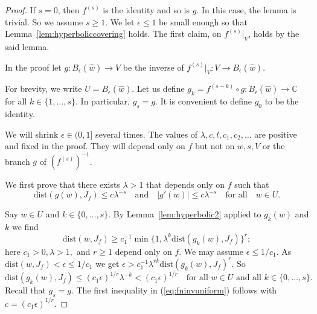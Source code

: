 \documentclass[10pt,a4paper]{amsart}
\newcommand{\varz}{w}
\newcommand{\IC}{\mathbb{C}}
\begin{document}
\begin{proof}
  If $s=0$, then $f^{(s)}$ is the identity and so is $g$. In this
  case, the lemma is trivial. So we assume $s\ge 1$. 
  We let $\epsilon \le 1$ be small enough so that 
  Lemma~\ref{lem:hyperboliccovering} holds.
  The first claim, on $f^{(s)}|_V$, holds by the said lemma.
  
  In the proof let
  $g\colon B_{\epsilon}(\widehat w)\rightarrow V$ be the inverse of
  $f^{(s)}|_V\colon V\rightarrow B_{\epsilon}(\widehat w)$.

  For brevity, we write $U = B_{\epsilon}(\widehat w)$. Let us define
  $g_k = f^{(s-k)}\circ g\colon B_{\epsilon}(\widehat w)\rightarrow \IC$
  for all $k\in \{1,\ldots,s\}$. In particular, $g_s=g$. It is
  convenient to define $g_0$ to be the identity.

  We will shrink $\epsilon\in (0,1]$ several times. The values of
  $\lambda,c,l,c_1,c_2,\ldots$ are positive and fixed in the proof. They
  will depend only on $f$ but not on $\widehat w,s,V$ or the branch
  $g$ of $(f^{(s)})^{-1}$.


  We first prove that there exists $\lambda > 1$
  that depends only on $f$
  such that
  \begin{equation}
    \label{eq:fninvuniform}
    \mathrm{dist}(g(\varz),J_f) \le c \lambda^{-s}
    \quad\text{and}\quad
    |g'(\varz)|\le c\lambda^{-s}
    \quad\text{for all}\quad w\in U. 
  \end{equation}


  Say $\varz\in U$ and $k\in \{0,\ldots,s\}$. By Lemma~\ref{lem:hyperbolic2}
  applied to $g_k(\varz)$ and $k$ we find
  \begin{equation*}
    \mathrm{dist}(\varz,J_f) \ge c_1^{-1}
    \min\{1,\lambda^k \mathrm{dist}(g_k(\varz),J_f)\}^r;   
  \end{equation*}
  here $c_1>0, \lambda > 1,$
  and $r\ge 1$ depend only on $f$.
  We may assume $\epsilon \le 1/c_1$. 
  As $\mathrm{dist}(\varz,J_f)<\epsilon\le 1/c_1$ we get
  $\epsilon >  c_1^{-1}
  \lambda^{rk} \mathrm{dist}(g_k(\varz),J_f)^r$.
  So 
  \begin{equation}
    \label{eq:gkapproaching}
    \mathrm{dist}(g_k(\varz),J_f) \le (c_1\epsilon)^{1/r} \lambda^{-k} < (c_1\epsilon)^{1/r}
    \quad\text{for all } \varz\in U\text{ and all }k\in
    \{0,\ldots,s\}. 
  \end{equation}
  Recall that $g_s=g$.
  The first inequality in 
  (\ref{eq:fninvuniform}) follows with
  $c = (c_1\epsilon)^{1/r}$.


\end{proof}
\end{document}
